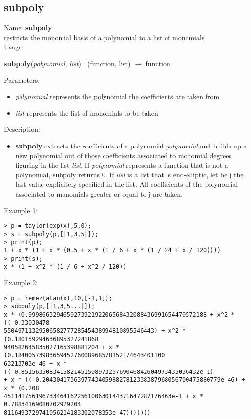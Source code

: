 \subsection{subpoly}
\label{labsubpoly}
\noindent Name: \textbf{subpoly}\\
restricts the monomial basis of a polynomial to a list of monomials\\

\noindent Usage: 
\begin{center}
\textbf{subpoly}(\emph{polynomial}, \emph{list}) : (\textsf{function}, \textsf{list}) $\rightarrow$ \textsf{function}\\
\end{center}
Parameters: 
\begin{itemize}
\item \emph{polynomial} represents the polynomial the coefficients are taken from
\item \emph{list} represents the list of monomials to be taken
\end{itemize}
\noindent Description: \begin{itemize}

\item \textbf{subpoly} extracts the coefficients of a polynomial \emph{polynomial} and builds up a
   new polynomial out of those coefficients associated to monomial degrees figuring in
   the list \emph{list}. 
   If \emph{polynomial} represents a function that is not a polynomial, subpoly returns 0.
   If \emph{list} is a list that is end-elliptic, let be j the last value explicitely specified
   in the list. All coefficients of the polynomial associated to monomials greater or
   equal to j are taken.
\end{itemize}
\noindent Example 1: 
\begin{center}\begin{minipage}{15cm}\begin{Verbatim}[frame=single]
> p = taylor(exp(x),5,0);
> s = subpoly(p,[|1,3,5|]);
> print(p);
1 + x * (1 + x * (0.5 + x * (1 / 6 + x * (1 / 24 + x / 120))))
> print(s);
x * (1 + x^2 * (1 / 6 + x^2 / 120))
\end{Verbatim}
\end{minipage}\end{center}
\noindent Example 2: 
\begin{center}\begin{minipage}{15cm}\begin{Verbatim}[frame=single]
> p = remez(atan(x),10,[-1,1]);
> subpoly(p,[|1,3,5...|]);
x * (0.999866329465927392192206568432088436991654470572188 + x^2 * ((-0.33030478
5504971132950658277728545438994810895546443) + x^2 * (0.180159294636895327241868
940582645835027165398881204 + x * (0.1840057398365945276008968578152174643401100
63213703e-46 + x * ((-0.851563508341582145150897325769046842604973435036432e-1) 
+ x * ((-0.204304173639774340598827812338387968056700475880779e-46) + x * (0.208
451141756196733464162256100630144371647287176463e-1 + x * 0.78834169080702929204
8116493729741056214183302078353e-47)))))))
\end{Verbatim}
\end{minipage}\end{center}
